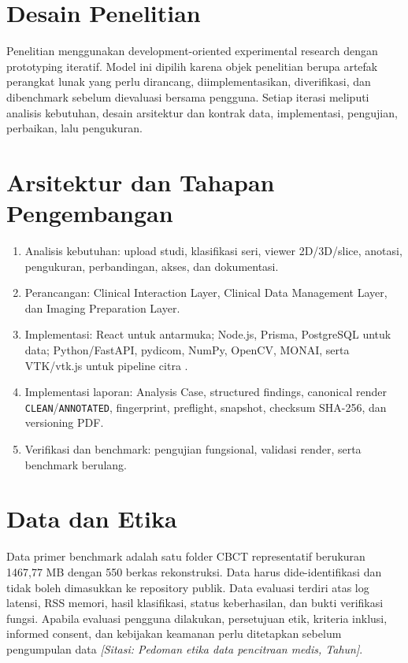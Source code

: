 \documentclass[12pt,a4paper,oneside]{report}
\newcommand{\sitasi}[1]{\textit{[Sitasi: #1]}}
\begin{document}
\section{Desain Penelitian}
Penelitian menggunakan development-oriented experimental research dengan prototyping iteratif. Model ini dipilih karena objek penelitian berupa artefak perangkat lunak yang perlu dirancang, diimplementasikan, diverifikasi, dan dibenchmark sebelum dievaluasi bersama pengguna. Setiap iterasi meliputi analisis kebutuhan, desain arsitektur dan kontrak data, implementasi, pengujian, perbaikan, lalu pengukuran.

\section{Arsitektur dan Tahapan Pengembangan}
\begin{enumerate}[label=\arabic*.]
\item Analisis kebutuhan: upload studi, klasifikasi seri, viewer 2D/3D/slice, anotasi, pengukuran, perbandingan, akses, dan dokumentasi.
\item Perancangan: Clinical Interaction Layer, Clinical Data Management Layer, dan Imaging Preparation Layer.
\item Implementasi: React untuk antarmuka; Node.js, Prisma, PostgreSQL untuk data; Python/FastAPI, pydicom, NumPy, OpenCV, MONAI, serta VTK/vtk.js untuk pipeline citra \cite{ref:monai-docs,ref:vtkjs,ref:schroeder2006}.
\item Implementasi laporan: Analysis Case, structured findings, canonical render \texttt{CLEAN}/\texttt{ANNOTATED}, fingerprint, preflight, snapshot, checksum SHA-256, dan versioning PDF.
\item Verifikasi dan benchmark: pengujian fungsional, validasi render, serta benchmark berulang.
\end{enumerate}

\section{Data dan Etika}
Data primer benchmark adalah satu folder CBCT representatif berukuran 1467,77 MB dengan 550 berkas rekonstruksi. Data harus dide-identifikasi dan tidak boleh dimasukkan ke repository publik. Data evaluasi terdiri atas log latensi, RSS memori, hasil klasifikasi, status keberhasilan, dan bukti verifikasi fungsi. Apabila evaluasi pengguna dilakukan, persetujuan etik, kriteria inklusi, informed consent, dan kebijakan keamanan perlu ditetapkan sebelum pengumpulan data \sitasi{Pedoman etika data pencitraan medis, Tahun}.
\end{document}
